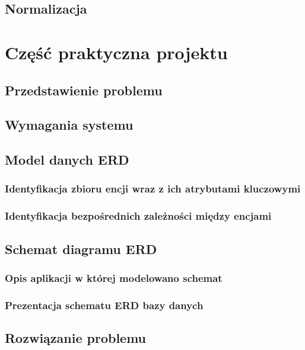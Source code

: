 \documentclass[polish, 11pt]{article}
\begin{document}
  		
    

    \subsection{Normalizacja}

\section{Część praktyczna projektu}
    \subsection{Przedstawienie problemu}

    \subsection{Wymagania systemu}
    
    \subsection{Model danych ERD}
		\subsubsection{Identyfikacja zbioru encji wraz z ich atrybutami kluczowymi}
	    
	    \subsubsection{Identyfikacja bezpośrednich zależności między encjami}
    
    \subsection{Schemat diagramu ERD}
	    \subsubsection{Opis aplikacji w której modelowano schemat}
	    
	    \subsubsection{Prezentacja schematu ERD bazy danych}

    \subsection{Rozwiązanie problemu}
\end{document}
